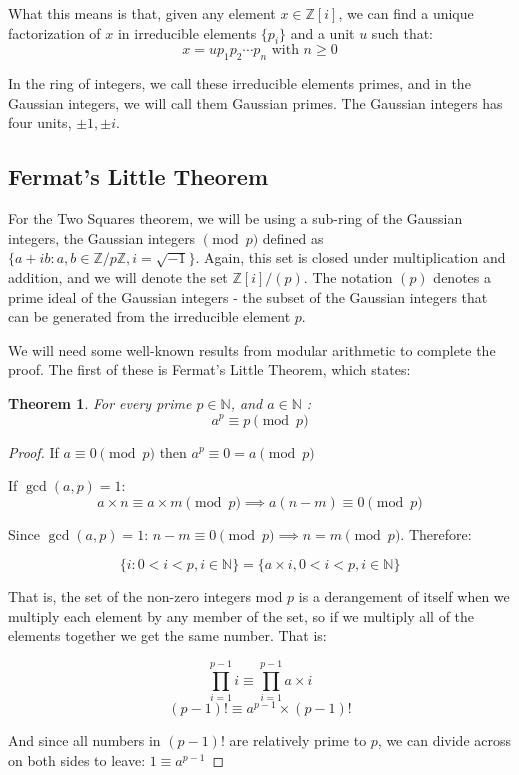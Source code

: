 \documentclass{article}
\newtheorem{theorem}{Theorem}[section]
\begin{document}
What this means is that, given any element $x \in \mathbb{Z}[i]$, we can find a unique
factorization of $x$ in irreducible elements $\{p_i\}$ and a unit $u$ such that:
\[ x = up_1p_2\cdots p_n \text{ with } n\geq 0 \]

In the ring of integers, we call these irreducible elements primes, and in the Gaussian
integers, we will call them Gaussian primes. The Gaussian integers has four units,
$\pm 1, \pm i$.

\subsection{Fermat's Little Theorem}

For the Two Squares theorem, we will be using a sub-ring of the Gaussian integers, the
Gaussian integers $\pmod{p}$ defined as $\{a+ib:a,b\in \mathbb{Z}/p\mathbb{Z}, i=\sqrt{-1}\}$.
Again, this set is closed under multiplication and addition, and we will denote the set 
$\mathbb{Z}[i]/(p)$. The notation $(p)$ denotes a prime ideal of the Gaussian integers - the
subset of the Gaussian integers that can be generated from the irreducible element $p$.

We will need some well-known results from modular arithmetic to complete the proof. The first
of these is Fermat's Little Theorem, which states:

\begin{theorem}For every prime $p \in \mathbb{N}$, and $a \in \mathbb{N}$ :
\[ a^p \equiv p \pmod{p} \]
\end{theorem}

\begin{proof}
If $a\equiv 0 \pmod{p}$ then $a^p \equiv 0 = a \pmod{p}$

If $\gcd(a,p)=1$: 
\[a \times n \equiv a \times m \pmod{p} \implies a(n-m) \equiv 0 \pmod{p} \]

Since $\gcd(a,p)=1$: $n-m\equiv 0 \pmod{p} \implies n = m \pmod{p}$. Therefore:

\[ \{i: 0 < i < p, i \in \mathbb{N}\} = \{a\times i, 0 < i < p, i \in \mathbb{N} \} \]

That is, the set of the non-zero integers mod $p$ is a derangement of itself when we 
multiply each element by any member of the set, so if we multiply all of the elements
together we get the same number. That is:

\[ \prod_{i=1}^{p-1} i \equiv \prod_{i=1}^{p-1} a\times i \]
\[ (p-1)! \equiv a^{p-1}\times (p-1)! \]

And since all numbers in $(p-1)!$ are relatively prime to $p$, we can divide across on both sides to
leave: $1 \equiv a^{p-1}$
\end{proof}
\end{document}
